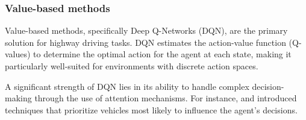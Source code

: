 \documentclass{article}
\begin{document}





\subsubsection{Value-based methods}

Value-based methods, specifically Deep Q-Networks (DQN), are the primary solution for highway driving tasks. DQN estimates the action-value function (Q-values) to determine the optimal action for the agent at each state, making it particularly well-suited for environments with discrete action spaces.

A significant strength of DQN lies in its ability to handle complex decision-making through the use of attention mechanisms. For instance, \citep{leurent_social_2019} and \citep{bellotti_designing_2023} introduced techniques that prioritize vehicles most likely to influence the agent’s decisions.  
\end{document}
